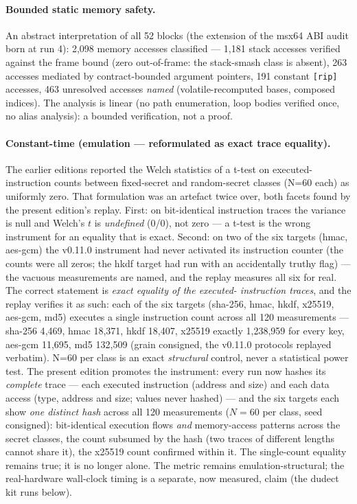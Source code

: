 \documentclass[11pt,a4paper]{article}
\newcommand{\code}[1]{\texttt{\small #1}}
\begin{document}
\paragraph{Bounded static memory safety.} An abstract interpretation of
all 52 blocks (the extension of the msx64 ABI audit born at run 4):
2{,}098 memory accesses classified --- 1{,}181 stack accesses verified
against the frame bound (zero out-of-frame: the stack-smash class is
absent), 263 accesses mediated by contract-bounded argument pointers, 191
constant \code{[rip]} accesses, 463 unresolved accesses \emph{named}
(volatile-recomputed bases, composed indices). The analysis is linear
(no path enumeration, loop bodies verified once, no alias analysis): a
bounded verification, not a proof.

\paragraph{Constant-time (emulation --- reformulated as exact trace equality).}
The earlier editions reported the Welch statistics of a t-test on
executed-instruction counts between fixed-secret and random-secret
classes (N=60 each) as uniformly zero. That formulation was an artefact
twice over, both
facets found by the present edition's replay. First: on bit-identical
instruction traces the variance is null and Welch's $t$ is \emph{undefined}
(0/0), not zero --- a t-test is the wrong instrument for an equality that
is exact. Second: on two of the six targets (hmac, aes-gcm) the v0.11.0
instrument had never activated its instruction counter (the counts were
all zeros; the hkdf target had run with an accidentally truthy flag) ---
the vacuous measurements are named, and the replay measures all six for
real. The correct statement is \emph{exact equality of the executed-
instruction traces}, and the replay verifies it as such: each of the six
targets (sha-256, hmac, hkdf, x25519, aes-gcm, md5) executes a single
instruction count across all 120 measurements --- sha-256 4{,}469, hmac
18{,}371, hkdf 18{,}407, x25519 exactly 1{,}238{,}959 for every key,
aes-gcm 11{,}695, md5 132{,}509 (grain consigned, the v0.11.0 protocols
replayed verbatim). N=60 per class is an exact \emph{structural}
control, never a statistical power test. The present edition promotes
the instrument: every run now hashes its \emph{complete} trace ---
each executed instruction (address and size) and each data access
(type, address and size; values never hashed) --- and the six targets
each show \emph{one distinct hash} across all 120 measurements
($N{=}60$ per class, seed consigned): bit-identical execution flows
\emph{and} memory-access patterns across the secret classes, the count
subsumed by the hash (two traces of different lengths cannot share
it), the x25519 count confirmed within it. The single-count equality
remains true; it is no longer alone. The metric remains
emulation-structural; the real-hardware wall-clock timing is a separate,
now measured, claim (the dudect kit runs below).
\end{document}
